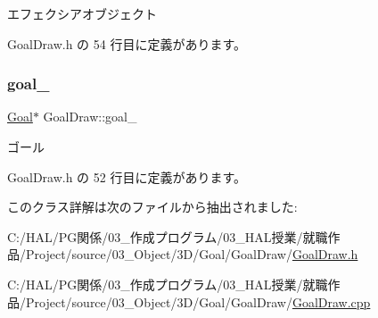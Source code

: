 エフェクシアオブジェクト 



 Goal\+Draw.\+h の 54 行目に定義があります。

\mbox{\label{class_goal_draw_abbb3b4db65f3908bad9b918c6feb6a7a}} 
\subsubsection{\texorpdfstring{goal\+\_\+}{goal\_}}
{\footnotesize\ttfamily \mbox{\hyperlink{class_goal}{Goal}}$\ast$ Goal\+Draw\+::goal\+\_\+\hspace{0.3cm}{\ttfamily [private]}}



ゴール 



 Goal\+Draw.\+h の 52 行目に定義があります。



このクラス詳解は次のファイルから抽出されました\+:\begin{DoxyCompactItemize}
\item 
C\+:/\+H\+A\+L/\+P\+G関係/03\+\_\+作成プログラム/03\+\_\+\+H\+A\+L授業/就職作品/\+Project/source/03\+\_\+\+Object/3\+D/\+Goal/\+Goal\+Draw/\mbox{\hyperlink{_goal_draw_8h}{Goal\+Draw.\+h}}\item 
C\+:/\+H\+A\+L/\+P\+G関係/03\+\_\+作成プログラム/03\+\_\+\+H\+A\+L授業/就職作品/\+Project/source/03\+\_\+\+Object/3\+D/\+Goal/\+Goal\+Draw/\mbox{\hyperlink{_goal_draw_8cpp}{Goal\+Draw.\+cpp}}\end{DoxyCompactItemize}
